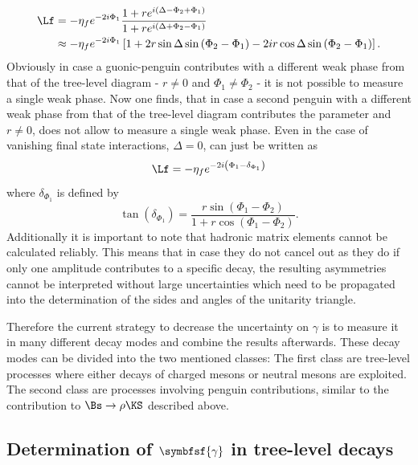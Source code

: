 \begin{align}
\Lf&=-\eta_fe^{-2i\Phi_1}\frac{1+re^{i\left(\Delta-\Phi_2+\Phi_1\right)}}{1+re^{i\left(\Delta+\Phi_2-\Phi_1\right)}}\nonumber\\
&\approx-\eta_fe^{-2i\Phi_1}\left[1+2r\sin\Delta\sin\left(\Phi_2-\Phi_1\right)-2ir\cos\Delta\sin\left(\Phi_2-\Phi_1\right)\right].
\end{align}
Obviously in case a guonic-penguin contributes with a different weak phase from that of the tree-level diagram - \ie $r\neq0$ and $\Phi_1\neq\Phi_2$ - it is not possible to measure a single weak phase.
Now one finds, that in case a second penguin with a different weak phase from that of the tree-level diagram contributes the parameter and $r\neq0$, \Lf does not allow to measure a single weak phase.
Even in the case of vanishing final state interactions, \ie $\Delta=0$, \Lf can just be written as
\begin{equation}
\Lf=-\eta_fe^{-2i\left(\Phi_1-\delta_{\Phi_1}\right)}
\end{equation}
where $\delta_{\Phi_1}$ is defined by
\begin{equation}
\tan\left(\delta_{\Phi_1}\right)=\frac{r\sin\left(\Phi_1-\Phi_2\right)}{1+r\cos\left(\Phi_1-\Phi_2\right)}.
\end{equation}
Additionally it is important to note that hadronic matrix elements cannot be calculated reliably.
This means that in case they do not cancel out as they do if only one amplitude contributes to a specific decay, the resulting \CP asymmetries cannot be interpreted without large uncertainties which need to be propagated into the determination of the sides and angles of the unitarity triangle.

Therefore the current strategy to decrease the uncertainty on $\gamma$ is to measure it in many different decay modes and combine the results afterwards.
These decay modes can be divided into the two mentioned classes: The first class are tree-level processes where either decays of charged \B mesons or neutral \B mesons are exploited.
The second class are processes involving penguin contributions, \eg similar to the contribution to $\Bs\to\rho\KS$ described above.

\subsection[head={Determination of $\gamma$ in tree-level decays},tocentry={Determination of $\gamma$ in tree-level decays}]{Determination of $\symbfsf{\gamma}$ in tree-level decays}
\label{sec:gamamInTrees}


